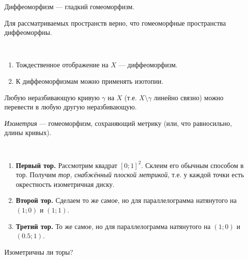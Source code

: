\documentclass[12pt,a4paper]{article}
\begin{document}
    \begin{definition}
        Диффеоморфизм --- гладкий гомеоморфизм.
    \end{definition}

    \begin{remark}
        Для рассматриваемых пространств верно, что гомеоморфные пространства диффеоморфны.
    \end{remark}

    \begin{example}\ 
        \begin{enumerate}
            \item Тождественное отображение на $X$ --- диффеоморфизм.
            \item К диффеоморфизмам можно применять изотопии.
        \end{enumerate}
    \end{example}

    \begin{problem}
        Любую неразбивающую кривую $\gamma$ на $X$ (т.е. $X \setminus \gamma$ линейно связно) можно перевести в любую другую неразбивающую.
    \end{problem}

    \begin{definition}
        \emph{Изометрия} --- гомеоморфизм, сохраняющий метрику (или, что равносильно, длины кривых). 
    \end{definition}

    \begin{problem}\ 
        \begin{enumerate}
            \item \textbf{Первый тор.} Рассмотрим квадрат $[0; 1]^2$. Склеим его обычным способом в тор. Получим \emph{тор, снабжённый плоской метрикой}, т.е. у каждой точки есть окрестность изометричная диску.
            \item \textbf{Второй тор.} Сделаем то же самое, но для параллелограмма натянутого на $(1; 0)$ и $(1; 1)$.
            \item \textbf{Третий тор.} То же самое, но для параллелограмма натянутого на $(1; 0)$ и $(0.5; 1)$.
        \end{enumerate}
        Изометричны ли торы?
    \end{problem}
\end{document}
